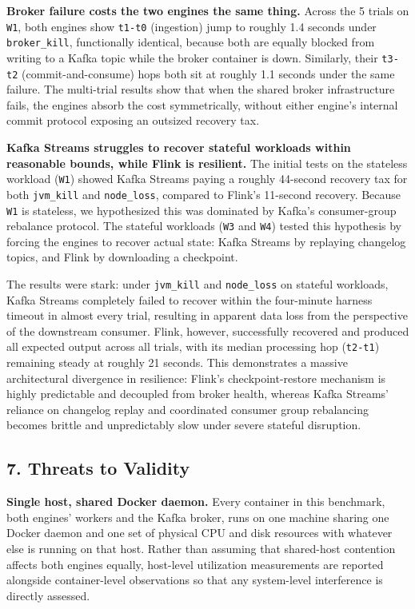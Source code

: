 \documentclass[
]{article}
\begin{document}
\textbf{Broker failure costs the two engines the same thing.} Across the
5 trials on \texttt{W1}, both engines show \texttt{t1-t0} (ingestion)
jump to roughly 1.4 seconds under \texttt{broker\_kill}, functionally
identical, because both are equally blocked from writing to a Kafka
topic while the broker container is down. Similarly, their
\texttt{t3-t2} (commit-and-consume) hops both sit at roughly 1.1 seconds
under the same failure. The multi-trial results show that when the
shared broker infrastructure fails, the engines absorb the cost
symmetrically, without either engine's internal commit protocol exposing
an outsized recovery tax.

\textbf{Kafka Streams struggles to recover stateful workloads within
reasonable bounds, while Flink is resilient.} The initial tests on the
stateless workload (\texttt{W1}) showed Kafka Streams paying a roughly
44-second recovery tax for both \texttt{jvm\_kill} and
\texttt{node\_loss}, compared to Flink's 11-second recovery. Because
\texttt{W1} is stateless, we hypothesized this was dominated by Kafka's
consumer-group rebalance protocol. The stateful workloads (\texttt{W3}
and \texttt{W4}) tested this hypothesis by forcing the engines to
recover actual state: Kafka Streams by replaying changelog topics, and
Flink by downloading a checkpoint.

The results were stark: under \texttt{jvm\_kill} and \texttt{node\_loss}
on stateful workloads, Kafka Streams completely failed to recover within
the four-minute harness timeout in almost every trial, resulting in
apparent data loss from the perspective of the downstream consumer.
Flink, however, successfully recovered and produced all expected output
across all trials, with its median processing hop (\texttt{t2-t1})
remaining steady at roughly 21 seconds. This demonstrates a massive
architectural divergence in resilience: Flink's checkpoint-restore
mechanism is highly predictable and decoupled from broker health,
whereas Kafka Streams' reliance on changelog replay and coordinated
consumer group rebalancing becomes brittle and unpredictably slow under
severe stateful disruption.

\hypertarget{threats-to-validity}{%
\subsection{7. Threats to Validity}\label{threats-to-validity}}

\textbf{Single host, shared Docker daemon.} Every container in this
benchmark, both engines' workers and the Kafka broker, runs on one
machine sharing one Docker daemon and one set of physical CPU and disk
resources with whatever else is running on that host.
Rather than assuming that shared-host contention affects both engines
equally, host-level utilization measurements are reported alongside
container-level observations so that any system-level interference is
directly assessed.
\end{document}
